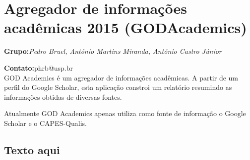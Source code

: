 \documentclass[12pt]{article}
\begin{document}
\section{Agregador de informações acadêmicas 2015 (GODAcademics)}

\textbf{Grupo:}\textit{Pedro Bruel, António Martins Miranda, António Castro Júnior}

\textbf{Contato:}phrb@usp.br\\

GOD Academics é um agregador de informações acadêmicas. A partir de um perfil 
do Google Scholar, esta aplicação constroi um relatório resumindo as 
informações obtidas de diversas fontes.

Atualmente GOD Academics apenas utiliza como fonte de informação o 
Google Scholar e o CAPES-Qualis.

\subsection{Texto aqui}
\end{document}
